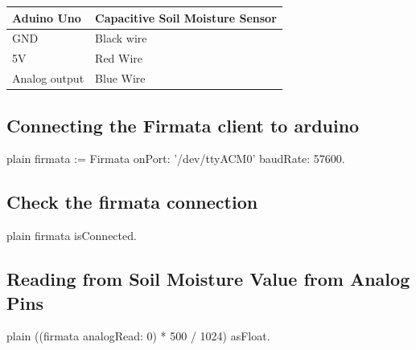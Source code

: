 \documentclass[10pt,twoside,english]{_support/latex/sbabook/sbabook}
\begin{document}
\begin{tabular}{ll}
\toprule
\textbf{Aduino Uno} & \textbf{Capacitive Soil Moisture Sensor} \\
\midrule
GND & Black wire \\
5V & Red Wire \\
Analog output & Blue Wire \\
\bottomrule
\end{tabular}
\subsection{Connecting the Firmata client to arduino}
\begin{displaycode}{plain}
  firmata := Firmata onPort: '/dev/ttyACM0' baudRate: 57600.
\end{displaycode}
\subsection{Check the firmata connection}
\begin{displaycode}{plain}
  firmata isConnected.
\end{displaycode}
\subsection{Reading from Soil Moisture Value from Analog Pins}
\begin{displaycode}{plain}
  ((firmata analogRead: 0) * 500 / 1024) asFloat.
\end{displaycode}






\backmatter

\end{document}

